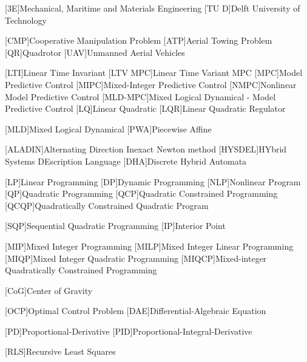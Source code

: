 \printacronyms

\begin{acronym}[\hspace{0.8in}] %
	[3E]{Mechanical, Maritime and Materials Engineering}%
	[TU D]{Delft University of Technology}%

	[CMP]{Cooperative Manipulation Problem}
	[ATP]{Aerial Towing Problem}
	[QR]{Quadrotor}
	[UAV]{Unmanned Aerial Vehicles}
	
	[LTI]{Linear Time Invariant}
	[LTV MPC]{Linear Time Variant MPC}
	[MPC]{Model Predictive Control}
	[MIPC]{Mixed-Integer Predictive Control}	
	[NMPC]{Nonlinear Model Predictive Control}
	[MLD-MPC]{Mixed Logical Dynamical - Model Predictive Control}
	[LQ]{Linear Quadratic}
	[LQR]{Linear Quadratic Regulator}

	[MLD]{Mixed Logical Dynamical}
	[PWA]{Piecewise Affine}

	[ALADIN]{Alternating Direction Inexact Newton method}
	[HYSDEL]{HYbrid Systems DEscription Language}	
	[DHA]{Discrete Hybrid Automata}
	
	[LP]{Linear Programming}
	[DP]{Dynamic Programming}	
	[NLP]{Nonlinear Program}
	[QP]{Quadratic Programming}
	[QCP]{Quadratic Constrained Programming}	
	[QCQP]{Quadratically Constrained Quadratic Program}
	
	[SQP]{Sequential Quadratic Programming}
	[IP]{Interior Point}
	
	[MIP]{Mixed Integer Programming}
	[MILP]{Mixed Integer Linear Programming}
	[MIQP]{Mixed Integer Quadratic Programming}
	[MIQCP]{Mixed-integer Quadratically Constrained Programming}

	
	[CoG]{Center of Gravity}
	
	[OCP]{Optimal Control Problem}
	[DAE]{Differential-Algebraic Equation}
	
	[PD]{Proportional-Derivative}
	[PID]{Proportional-Integral-Derivative}
	
	[RLS]{Recursive Least Squares}



\end{acronym}